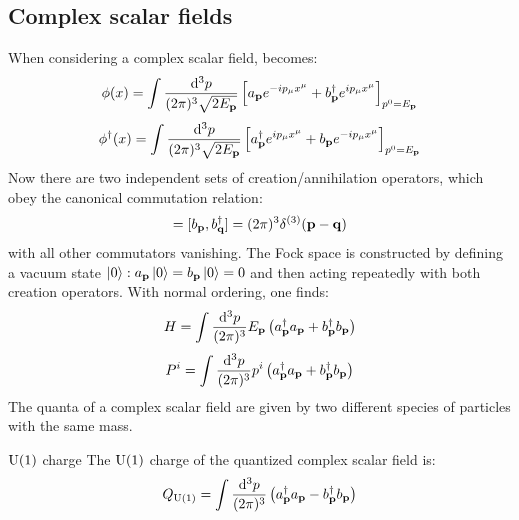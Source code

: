 \subsection{Complex scalar fields}

When considering a complex scalar field,  becomes:
\begin{equation}
  \phi(x) = \int \frac{\mathrm{d}^3p}{(2\pi)^3 \sqrt{2E_{\mathbf{p}}}} \left[ a_{\mathbf{p}} e^{-i p_\mu x^\mu} + b_{\mathbf{p}}^\dagger e^{i p_\mu x^\mu} \right]_{p^0 = E_{\mathbf{p}}}
\end{equation}
\begin{equation}
  \phi^\dagger(x) = \int \frac{\mathrm{d}^3p}{(2\pi)^3 \sqrt{2E_{\mathbf{p}}}} \left[ a_{\mathbf{p}}^\dagger e^{i p_\mu x^\mu} + b_{\mathbf{p}} e^{-i p_\mu x^\mu} \right]_{p^0 = E_{\mathbf{p}}}
\end{equation}
Now there are two independent sets of creation/annihilation operators, which obey the canonical commutation relation:
\begin{equation}
  [a_\ve{p} , a_\ve{q}^\dagger] = [b_\ve{p} , b_\ve{q}^\dagger] = (2\pi)^3 \delta^{(3)}(\ve{p} - \ve{q})
\end{equation}
with all other commutators vanishing. The Fock space is constructed by defining a vacuum state $ \ket{0} : a_{\mathbf{p}} \ket{0} = b_{\mathbf{p}} \ket{0} = 0 $ and then acting repeatedly with both creation operators. With normal ordering, one finds:
\begin{equation}
  H = \int \frac{\mathrm{d}^3p}{(2\pi)^3} E_{\mathbf{p}} \left( a_{\mathbf{p}}^\dagger a_{\mathbf{p}} + b_{\mathbf{p}}^\dagger b_{\mathbf{p}} \right)
\end{equation}
\begin{equation}
  P^i = \int \frac{\mathrm{d}^3p}{(2\pi)^3} p^i \left( a_{\mathbf{p}}^\dagger a_{\mathbf{p}} + b_{\mathbf{p}}^\dagger b_{\mathbf{p}} \right)
\end{equation}
The quanta of a complex scalar field are given by two different species of particles with the same mass.

\begin{proposition}{$ \mathrm{U}(1) $ charge}{}
  The $ \mathrm{U}(1) $ charge of the quantized complex scalar field is:
  \begin{equation}
    Q_{\mathrm{U}(1)} = \int \frac{\mathrm{d}^3p}{(2\pi)^3} \left( a_{\mathbf{p}}^\dagger a_{\mathbf{p}} - b_{\mathbf{p}}^\dagger b_{\mathbf{p}} \right)
  \end{equation}
\end{proposition}

